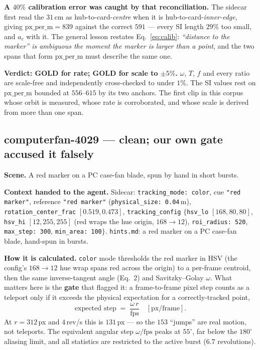 \documentclass[11pt,a4paper]{article}
\begin{document}
\textbf{A $40\%$ calibration error was caught by that reconciliation.} The sidecar first read the
$31$\,cm as hub-to-card-\emph{centre} when it is hub-to-card-\emph{inner-edge}, giving
$\mathrm{px\_per\_m} = 839$ against the correct $591$ --- every SI length $29\%$ too small, and
$a_c$ with it. The general lesson restates Eq.~\eqref{eq:calib}: \emph{``distance to the marker'' is
ambiguous the moment the marker is larger than a point}, and the two spans that form
$\mathrm{px\_per\_m}$ must describe the same one.

\textbf{Verdict: GOLD for rate; GOLD for scale to ${\pm}5\%$.} $\omega$, $T$, $f$ and every ratio
are scale-free and independently cross-checked to under $1\%$. The SI values rest on
$\mathrm{px\_per\_m}$ bounded at $556$--$615$ by its two anchors. The first clip in this corpus
whose orbit is measured, whose rate is corroborated, and whose scale is derived from more than
one span.

\subsection{computerfan-4029 --- clean; our own gate accused it falsely}
\label{sec:4029}

\textbf{Scene.} A red marker on a PC case-fan blade, spun by hand in short bursts.

\textbf{Context handed to the agent.} Sidecar: \texttt{tracking\_mode: color}, cue
\texttt{"red marker"}, reference \texttt{"red marker"} (\texttt{physical\_size: 0.04}\,m),
\texttt{rotation\_center\_frac} $[0.519,0.473]$, \texttt{tracking\_config} $\{$\texttt{hsv\_lo}
$[168,80,80]$, \texttt{hsv\_hi} $[12,255,255]$ (red wraps the hue origin, $168\to12$),
\texttt{roi\_radius: 520}, \texttt{max\_step: 300}, \texttt{min\_area: 100}$\}$. \texttt{hints.md}:
a red marker on a PC case-fan blade, hand-spun in bursts.

\textbf{How it is calculated.} \texttt{color} mode thresholds the red marker in HSV (the config's
$168\to12$ hue wrap spans red across the origin) to a per-frame centroid, then the same
inverse-tangent angle (Eq.~2) and Savitzky--Golay $\omega$. What matters here is the \textbf{gate}
that flagged it: a frame-to-frame pixel step counts as a teleport only if it exceeds the physical
expectation for a correctly-tracked point,
\[
  \text{expected step} \;=\; \frac{\omega\, r}{\mathrm{fps}} \quad [\mathrm{px/frame}].
\]
At $r{=}312$\,px and $4$\,rev/s this is $131$\,px --- so the $153$ ``jumps'' are real motion, not
teleports. The equivalent angular step $\omega/\mathrm{fps}$ peaks at $55^\circ$, far below the
$180^\circ$ aliasing limit, and all statistics are restricted to the active burst
($6.7$ revolutions).
\end{document}
